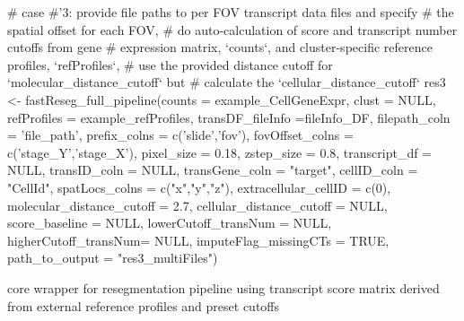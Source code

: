 \documentclass[letterpaper]{book}
\begin{document}
\begin{Examples}
\begin{ExampleCode}
# case #'3: provide file paths to per FOV transcript data files and specify 
# the spatial offset for each FOV,
# do auto-calculation of score and transcript number cutoffs from gene 
# expression matrix, `counts`, and cluster-specific reference profiles, `refProfiles`,
# use the provided distance cutoff for `molecular_distance_cutoff` but 
# calculate the `cellular_distance_cutoff`
res3 <- fastReseg_full_pipeline(counts = example_CellGeneExpr,
                                clust = NULL,
                                refProfiles = example_refProfiles,
                                transDF_fileInfo =fileInfo_DF,
                                filepath_coln = 'file_path',
                                prefix_colns = c('slide','fov'),
                                fovOffset_colns = c('stage_Y','stage_X'), 
                                pixel_size = 0.18, 
                                zstep_size = 0.8, 
                                transcript_df = NULL,
                                transID_coln = NULL, 
                                transGene_coln = "target",
                                cellID_coln = "CellId",
                                spatLocs_colns = c("x","y","z"),
                                extracellular_cellID = c(0), 
                                molecular_distance_cutoff = 2.7,
                                cellular_distance_cutoff = NULL,
                                score_baseline = NULL,
                                lowerCutoff_transNum = NULL,
                                higherCutoff_transNum= NULL,
                                imputeFlag_missingCTs = TRUE,
                                path_to_output = "res3_multiFiles")
\end{ExampleCode}
\end{Examples}
%
\begin{Description}
core wrapper for resegmentation pipeline using transcript score matrix derived from external reference profiles and preset cutoffs
\end{Description}
%
\end{document}

